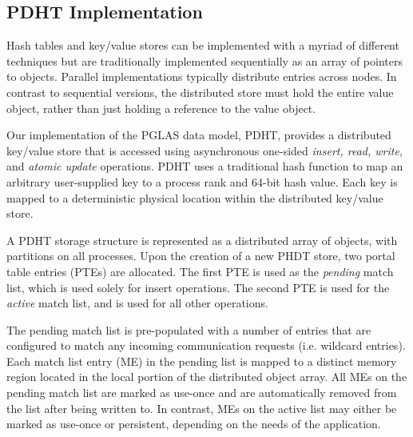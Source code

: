 \subsection{PDHT Implementation}

Hash tables and key/value stores can be implemented with a myriad of different
techniques but are traditionally implemented sequentially as an array of
pointers to objects.  Parallel implementations typically distribute entries
across nodes. In contrast to sequential versions, the distributed store must
hold the entire value object, rather than just holding a reference to the value
object.



Our implementation of the PGLAS data model, PDHT, provides a distributed
key/value store that is accessed using asynchronous one-sided {\em insert,
  read, write,} and {\em atomic update} operations. PDHT uses a traditional
hash function\cite{cityhash} to map an arbitrary user-supplied key to a process
rank and 64-bit hash value. Each key is mapped to a deterministic physical
location within the distributed key/value store.

A PDHT storage structure is represented as a distributed array of objects, with
partitions on all processes. Upon the creation of a new PHDT store, two portal
table entries (PTEs) are allocated. The first PTE is used as the {\em pending}
match list, which is used solely for insert operations.  The second PTE is used
for the {\em active} match list, and is used for all other operations. 

The pending match list is pre-populated with a number of entries that are
configured to match any incoming communication requests (i.e. wildcard
entries). Each match list entry (ME) in the pending list is mapped to a
distinct memory region located in the local portion of the distributed object
array. All MEs on the pending match list are marked as use-once and are
automatically removed from the list after being written to. In contrast, MEs on
the active list may either be marked as use-once or persistent, depending on
the needs of the application.

